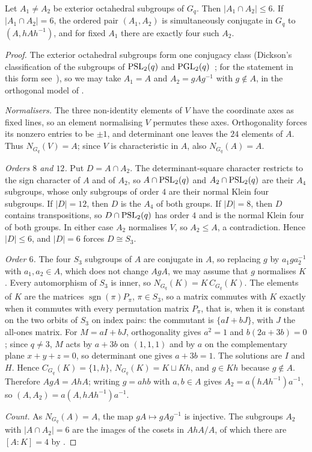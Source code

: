 \begin{proposition}
\label{prop:octahedral-cap6}
Let $A_1\ne A_2$ be exterior octahedral subgroups of $G_q$. Then
$|A_1\cap A_2|\le6$. If $|A_1\cap A_2|=6$, the ordered pair $(A_1,A_2)$
is simultaneously conjugate in $G_q$ to $(A,hAh^{-1})$, and for fixed
$A_1$ there are exactly four such $A_2$.
\end{proposition}
\begin{proof}
The exterior octahedral subgroups form one conjugacy class (Dickson's
classification of the subgroups of $\operatorname{PSL}_2(q)$ and
$\operatorname{PGL}_2(q)$~\cite{Huppert1967,King2005}; for the statement in this form
see~\cite[proof of Proposition~3.4]{Giudici2007}), so we may take $A_1=A$ and
$A_2=gAg^{-1}$ with $g\notin A$, in the orthogonal model of
.

\emph{Normalisers.} The three non-identity elements of $V$ have the
coordinate axes as fixed lines, so an element normalising $V$ permutes
these axes. Orthogonality forces its nonzero entries to be $\pm1$, and
determinant one leaves the $24$ elements of $A$. Thus $N_{G_q}(V)=A$;
since $V$ is characteristic in $A$, also $N_{G_q}(A)=A$.

\emph{Orders $8$ and $12$.} Put $D=A\cap A_2$. The determinant-square
character restricts to the sign character of $A$ and of $A_2$, so
$A\cap\operatorname{PSL}_2(q)$ and $A_2\cap\operatorname{PSL}_2(q)$ are their $A_4$ subgroups, whose
only subgroups of order $4$ are their normal Klein four subgroups. If
$|D|=12$, then $D$ is the $A_4$ of both groups. If $|D|=8$, then $D$
contains transpositions, so $D\cap\operatorname{PSL}_2(q)$ has order $4$ and is the
normal Klein four of both groups. In either case $A_2$ normalises $V$,
so $A_2\le A$, a contradiction. Hence $|D|\le6$, and $|D|=6$ forces
$D\cong S_3$.

\emph{Order $6$.} The four $S_3$ subgroups of $A$ are conjugate in $A$,
so replacing $g$ by $a_1ga_2^{-1}$ with $a_1,a_2\in A$, which does not
change $AgA$, we may assume that $g$ normalises $K$. Every automorphism of
$S_3$ is inner, so $N_{G_q}(K)=K\,C_{G_q}(K)$. The elements of $K$ are the
matrices $\operatorname{sgn}(\pi)P_\pi$, $\pi\in S_3$, so a matrix commutes
with $K$ exactly when it commutes with every permutation matrix $P_\pi$,
that is, when it is constant on the two orbits of $S_3$ on index pairs:
the commutant is $\{aI+bJ\}$, with $J$ the all-ones matrix. For
$M=aI+bJ$, orthogonality gives $a^2=1$ and $b(2a+3b)=0$; since $q\ne3$,
$M$ acts by $a+3b$ on $(1,1,1)$ and by $a$ on the complementary plane
$x+y+z=0$, so determinant one gives $a+3b=1$. The solutions are $I$ and
$H$. Hence $C_{G_q}(K)=\{1,h\}$, $N_{G_q}(K)=K\sqcup Kh$, and $g\in Kh$
because $g\notin A$. Therefore $AgA=AhA$; writing $g=ahb$ with $a,b\in A$
gives $A_2=a(hAh^{-1})a^{-1}$, so $(A,A_2)=a(A,hAh^{-1})a^{-1}$.

\emph{Count.} As $N_{G_q}(A)=A$, the map $gA\mapsto gAg^{-1}$ is
injective. The subgroups $A_2$ with $|A\cap A_2|=6$ are the images of the
cosets in $AhA/A$, of which there are $[A:K]=4$ by
.
\end{proof}

